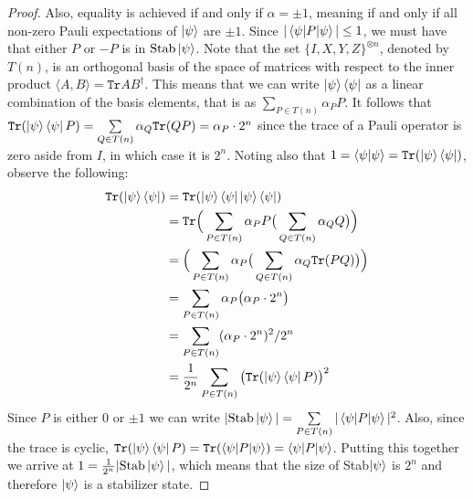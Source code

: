 \documentclass[12pt]{dalthesis}
\begin{document}
\begin{proof}
Also, equality is achieved if and only if $\alpha = \pm 1$,  meaning if and only if all non-zero Pauli expectations of $\ket{\psi}$ are $\pm 1$. Since $|\braket{\psi |P| \psi}| \leq 1$, we must have that either $P$ or $-P$ is in $\mathrm{Stab}\ket{\psi}$. Note that the set $\{ I, X, Y, Z \}^{\otimes n}$, denoted by $T(n)$, is an orthogonal basis of the space of matrices with respect to the inner product $\langle A, B \rangle = \texttt{Tr} AB^{\dag}$. This means that we can write $\ket{\psi} \bra{\psi}$ as a linear combination of the basis elements, that is as $\sum\limits_{P\in T(n)} \alpha_PP $. It follows that $\texttt{Tr}(\ket{\psi}\bra{\psi}P) = \sum\limits_{Q\in T(n)} \alpha_Q \texttt{Tr}(QP) = \alpha_P \cdot 2^n$ since the trace of a Pauli operator is zero aside from $I$, in which case it is $2^n$. Noting also that $1 = \braket{\psi |\psi} = \texttt{Tr}(\ket{\psi}\bra{\psi})$, observe the following:
\begin{equation}
\begin{split}
\texttt{Tr}(\ket{\psi}\bra{\psi}) & = \texttt{Tr}(\ket{\psi}\bra{\psi}\ket{\psi}\bra{\psi}) \\
& = \texttt{Tr} \Big( \sum\limits_{P\in T(n)} \alpha_PP \big( \sum\limits_{Q\in T(n)} \alpha_QQ \big) \Big) \\
& =  \Big( \sum\limits_{P\in T(n)} \alpha_P \big( \sum\limits_{Q\in T(n)} \alpha_Q \texttt{Tr}(PQ) \big) \Big) \\
& = \sum\limits_{P\in T(n)} \alpha_P \big( \alpha_P \cdot 2^n \big) \\
& = \sum\limits_{P\in T(n)} (\alpha_P \cdot 2^n)^2/2^n \\
& = \frac{1}{2^n} \sum\limits_{P\in T(n)} \big( \texttt{Tr}(\ket{\psi}\bra{\psi}P) \big)^2
\end{split}
\end{equation}
Since $P$ is either $0$ or $\pm 1$ we can write $|\mathrm{Stab}\ket{\psi}| = \sum\limits_{P\in T(n)} |\braket{\psi |P|\psi}|^2$. Also, since the trace is cyclic, $\texttt{Tr}(\ket{\psi}\bra{\psi}P) = \texttt{Tr}(\braket{\psi | P | \psi}) = \braket{\psi | P | \psi}$. Putting this together we arrive at $1 = \frac{1}{2^n} |\mathrm{Stab}\ket{\psi}|$, which means that the size of Stab$\ket{\psi}$ is $2^n$ and therefore $\ket{\psi}$ is a stabilizer state.
\end{proof}
\end{document}
